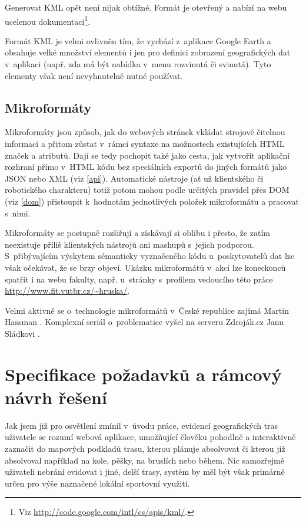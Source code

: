 Generovat KML opět není nijak obtížné. Formát je otevřený a nabízí na
webu ucelenou dokumentaci\footnote{Viz
\url{http://code.google.com/intl/cs/apis/kml/}.}.

Formát KML je velmi ovlivněn tím, že vychází z~aplikace Google Earth
a obsahuje velké množství elementů i jen pro definici zobrazení
geografických dat v~aplikaci (např. zda má být nabídka v~menu
rozvinutá či svinutá). Tyto elementy však není nevyhnutelně nutné
používat.

\section{Mikroformáty}\label{microformats}
Mikroformáty jsou způsob, jak do webových stránek vkládat strojově
čitelnou informaci a přitom zůstat v~rámci syntaxe na možnostech
existujících HTML značek a atributů. Dají se tedy pochopit také jako
cesta, jak vytvořit aplikační rozhraní přímo v~HTML kódu bez
speciálních exportů do jiných formátů jako JSON nebo XML (viz
\ref{api}). Automatické nástroje (ať už klientského či robotického
charakteru) totiž potom mohou podle určitých pravidel přes DOM (viz
\ref{dom}) přistoupit k~hodnotám jednotlivých položek
mikroformátu a pracovat s~nimi.

Mikroformáty se postupně rozšiřují a získávají si oblibu i přesto, že
zatím neexistuje příliš klientských nástrojů ani mashupů s~jejich
podporou. S~přibývajícím výskytem sémanticky vyznačeného kódu
u~poskytovatelů dat lze však očekávat, že se brzy objeví. Ukázku
mikroformátů v~akci lze koneckonců spatřit i na webu
fakulty, např. u~stránky s~profilem vedoucího této práce
\url{http://www.fit.vutbr.cz/~hruska/}.

Velmi aktivně se o~technologie mikroformátů v~České republice zajímá
Martin Hassman \cite{mfLupa}. Komplexní seriál o~problematice vyšel
na serveru Zdroják.cz Janu Sládkovi \cite{mf}.

\chapter{Specifikace požadavků a rámcový návrh řešení}

Jak jsem již pro osvětlení zmínil v~úvodu práce, evidencí
geografických tras uživatele se rozumí webová aplikace, umožňující
člověku pohodlně a interaktivně zaznačit do mapových podkladů trasu,
kterou plánuje absolvovat či kterou již absolvoval například na kole,
pěšky, na bruslích nebo během. Nic samozřejmě uživateli nebrání
evidovat i jiné, delší trasy, systém by měl být však primárně určen
pro výše naznačené lokální sportovní využití.

